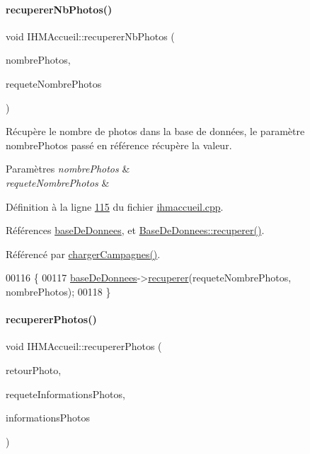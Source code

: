 \paragraph{\texorpdfstring{recuperer\+Nb\+Photos()}{recupererNbPhotos()}}
{\footnotesize\ttfamily void I\+H\+M\+Accueil\+::recuperer\+Nb\+Photos (\begin{DoxyParamCaption}\item[{Q\+String \&}]{nombre\+Photos,  }\item[{Q\+String \&}]{requete\+Nombre\+Photos }\end{DoxyParamCaption})\hspace{0.3cm}{\ttfamily [private]}}



Récupère le nombre de photos dans la base de données, le paramètre nombre\+Photos passé en référence récupère la valeur. 


\begin{DoxyParams}{Paramètres}
{\em nombre\+Photos} & \\
\hline
{\em requete\+Nombre\+Photos} & \\
\hline
\end{DoxyParams}


Définition à la ligne \hyperlink{ihmaccueil_8cpp_source_l00115}{115} du fichier \hyperlink{ihmaccueil_8cpp_source}{ihmaccueil.\+cpp}.



Références \hyperlink{ihmaccueil_8h_source_l00040}{base\+De\+Donnees}, et \hyperlink{basededonnees_8cpp_source_l00139}{Base\+De\+Donnees\+::recuperer()}.



Référencé par \hyperlink{ihmaccueil_8cpp_source_l00130}{charger\+Campagnes()}.


\begin{DoxyCode}
00116 \{
00117     \hyperlink{class_i_h_m_accueil_ab56d9846c071396a92f88272880e2c1f}{baseDeDonnees}->\hyperlink{class_base_de_donnees_a77539baad389f5acf754cd2cd452403e}{recuperer}(requeteNombrePhotos, nombrePhotos);
00118 \}
\end{DoxyCode}
\mbox{\label{class_i_h_m_accueil_aebeef48b9bc345edd02e5185951c454e}} 
\paragraph{\texorpdfstring{recuperer\+Photos()}{recupererPhotos()}}
{\footnotesize\ttfamily void I\+H\+M\+Accueil\+::recuperer\+Photos (\begin{DoxyParamCaption}\item[{bool \&}]{retour\+Photo,  }\item[{Q\+String \&}]{requete\+Informations\+Photos,  }\item[{Q\+Vector$<$ Q\+String\+List $>$ \&}]{informations\+Photos }\end{DoxyParamCaption})\hspace{0.3cm}{\ttfamily [private]}}



